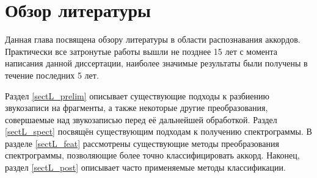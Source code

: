 \chapter{Обзор литературы} \label{chaptL}

Данная глава посвящена обзору литературы в области распознавания аккордов.
Практически все затронутые работы вышли не позднее 15 лет с момента написания
данной диссертации, наиболее значимые результаты были получены в течение
последних 5 лет.

Раздел \ref{sectL_prelim} описывает существующие подходы к разбиению звукозаписи
на фрагменты, а также некоторые другие преобразования, совершаемые над
звукозаписью перед её дальнейшей обработкой. Раздел \ref{sectL_spect} посвящён
существующим подходам к получению спектрограммы. В разделе \ref{sectL_feat}
рассмотрены существующие методы преобразования спектрограммы, позволяющие более
точно классифицировать аккорд. Наконец, раздел \ref{sectL_post} описывает часто
применяемые методы классификации.

% 




